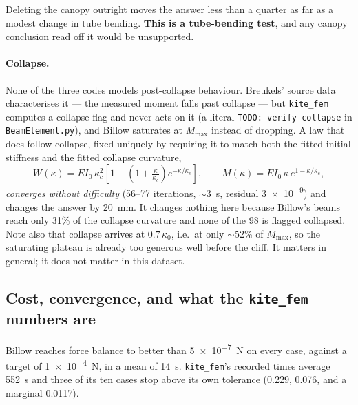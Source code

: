\documentclass[11pt,a4paper]{article}
\begin{document}
Deleting the canopy outright moves the answer less than a quarter as far as a
modest change in tube bending. \textbf{This is a tube-bending test}, and any
canopy conclusion read off it would be unsupported.

\paragraph{Collapse.} None of the three codes models post-collapse behaviour.
Breukels' source data characterises it --- the measured moment falls past
collapse --- but \texttt{kite\_fem} computes a collapse flag and never acts on
it (a literal \texttt{TODO: verify collapse} in \texttt{BeamElement.py}), and
Billow saturates at $M_\text{max}$ instead of dropping. A law that does follow
collapse, fixed uniquely by requiring it to match both the fitted initial
stiffness and the fitted collapse curvature,
\begin{equation}
W(\kappa) = EI_0\,\kappa_c^{2}
\left[1-\left(1+\tfrac{\kappa}{\kappa_c}\right)e^{-\kappa/\kappa_c}\right],
\qquad
M(\kappa) = EI_0\,\kappa\,e^{1-\kappa/\kappa_c},
\end{equation}
\emph{converges without difficulty} (56--77 iterations, $\sim$\SI{3}{s},
residual \num{3e-9}) and changes the answer by \SI{20}{mm}. It changes nothing
here because Billow's beams reach only 31\% of the collapse curvature and none
of the 98 is flagged collapsed. Note also that collapse arrives at
$0.7\,\kappa_0$, i.e.\ at only $\sim$52\% of $M_\text{max}$, so the saturating
plateau is already too generous well before the cliff. It matters in general;
it does not matter in this dataset.

\subsection{Cost, convergence, and what the \texttt{kite\_fem} numbers are}

\begin{table}[htbp]
\centering
\caption{Solver cost. $^{\ast}$ marks cases that never reached
\texttt{kite\_fem}'s own \num{0.01} tolerance. \textbf{The two time columns were
measured on different machines} and are not a controlled benchmark --- see the
caveats below.}

\end{table}

Billow reaches force balance to better than \SI{5e-7}{N} on every case, against
a target of \SI{1e-4}{N}, in a mean of \SI{14}{s}. \texttt{kite\_fem}'s recorded
times average \SI{552}{s} and three of its ten cases stop above its own
tolerance (\num{0.229}, \num{0.076}, and a marginal \num{0.0117}).
\end{document}
